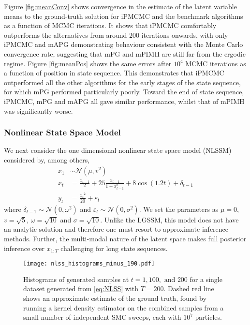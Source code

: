 Figure \ref{fig:meanConv} shows convergence in the estimate of the latent variable means to the ground-truth solution for iPMCMC and the benchmark algorithms as a function of MCMC iterations.  It shows that iPMCMC comfortably outperforms the alternatives from around 200 iterations onwards, with only iPMCMC and mAPG demonstrating behaviour consistent with the Monte Carlo convergence rate, suggesting that mPG and mPIMH are still far from the ergodic regime.  Figure \ref{fig:meanPos} shows the same errors after $10^4$ MCMC iterations as a function of position in state sequence.  This demonstrates that iPMCMC outperformed all the other algorithms for the early stages of the state sequence, for which mPG performed particularly poorly. Toward the end of state sequence, iPMCMC, mPG and mAPG all gave similar performance, whilst that of mPIMH was significantly worse.

\subsubsection{Nonlinear State Space Model}
\label{sec:nlss}

We next consider the one dimensional nonlinear state space model (NLSSM) considered by, among others, \citet{gordon1993novel,andrieuDH2010}
\begin{subequations}
	\label{eq:NLSS}
	\begin{align}
	x_1 & \sim \mathcal{N} \left(\mu, v^2\right) \label{eq:NLSSa}\\
	x_t & = \frac{x_{t-1}}{2} + 25 \frac{x_{t-1}}{1+x_{t-1}^2} + 8 \cos \left(1.2t\right) + \delta_{t-1} \label{eq:NLSSb} \\
	y_t & = \frac{{x_{t}}^2}{20} + \varepsilon_{t} \label{eq:NLSSc}
	\end{align}
\end{subequations}
where $\delta_{t-1} \sim \mathcal{N} \left(0, \omega^2\right)$ and $\varepsilon_{t} \sim \mathcal{N} \left(0, \sigma^2\right)$.  We set the parameters as $\mu = 0$, $v=\sqrt{5}$, $\omega = \sqrt{10}$ and $\sigma = \sqrt{10}$.  Unlike the LGSSM, this model does not have an analytic solution and therefore one must resort to approximate inference methods. 
Further, the multi-modal nature of the latent space makes full posterior inference over $x_{1:T}$ challenging for long state sequences. 

\begin{figure*}[t]
	\centering
	\texttt{[image: nlss\_histograms\_minus\_190.pdf]}
	\caption{Histograms of generated samples at $t=1, 100, \text{ and } 200$ for a single dataset generated from \eqref{eq:NLSS} with $T=200$.  Dashed red line shows an approximate estimate of the ground truth, found by running a kernel density estimator on the combined samples from a small number of independent SMC sweeps, each with $10^7$ particles. \label{fig:nlssHists}}
\end{figure*}

